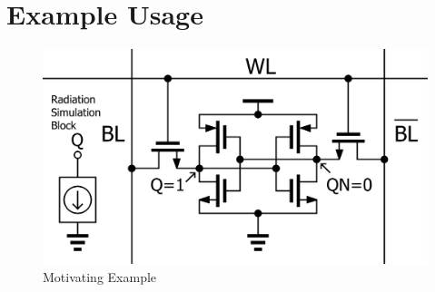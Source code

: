 \documentclass[conference]{IEEEtran}
\begin{document}





	\section{Example Usage}\label{sec:example-usage}
	\begin{figure}[htbp]
        \centering
        \includegraphics[width=0.95\linewidth]{sram_circuit}
        \caption{Motivating Example}
        \label{fig:motivating_example}
    \end{figure}    
    
\end{document}
